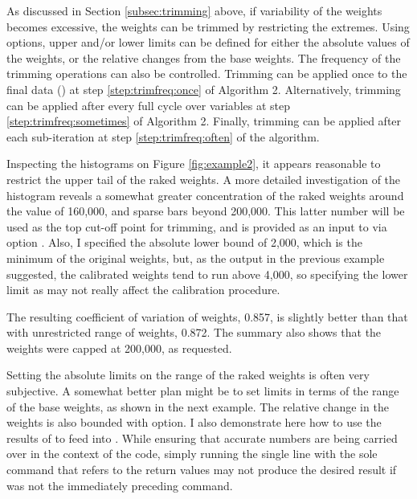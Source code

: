 As discussed in Section \ref{subsec:trimming} above, if variability of the weights
becomes excessive, the weights can be trimmed by restricting the extremes.
Using  options, upper and/or lower limits can be defined
for either the absolute values of the weights, or the relative changes from
the base weights. The frequency of the trimming operations can also be controlled.
Trimming can be applied once to the final data ()
at step \ref{step:trimfreq:once} of Algorithm 2.
Alternatively, trimming can be applied after every full cycle over variables
at step \ref{step:trimfreq:sometimes} of Algorithm 2.
Finally, trimming can be applied after each sub-iteration
at step \ref{step:trimfreq:often} of the algorithm.

\begin{stexample}[Example 3]

Inspecting the histograms on Figure \ref{fig:example2}, it appears reasonable
to restrict the upper tail of the raked weights. A more detailed investigation
of the histogram reveals a somewhat greater concentration of the raked weights
around the value of 160,000, and sparse bars beyond 200,000. This latter number
will be used as the top cut-off point for trimming, and is provided as an input
to  via option . Also, I specified the absolute
lower bound of 2,000, which is the minimum of the original weights, but, 
as the output in the previous example suggested, the calibrated weights tend to run
above 4,000, so specifying the lower limit as  may not really
affect the calibration procedure.

\begin{stlog}
\nullskip
\end{stlog}

The resulting coefficient of variation of weights, 0.857, is slightly
better than that with unrestricted range of weights, 0.872. The summary also shows
that the weights were capped at 200,000, as requested.

Setting the absolute limits on the range of the raked weights is often
very subjective. A somewhat better plan might be to set limits in terms
of the range of the base weights, as shown in the next example. The relative
change in the weights is also bounded with  option.
I also demonstrate here how to use the results of  to feed
into . While ensuring that accurate numbers are being carried
over in the context of the code, simply running the single line with the sole
 command that refers to the  return values 
may not produce the desired result if  was not the 
immediately preceding command.

\begin{stlog}
\nullskip
\end{stlog}

\end{stexample}

